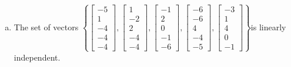 \begin{exerciseAnswer}
\begin{enumerate}[(a)]
\item  The set of vectors \( \left\{ \left[\begin{array}{c}
-5 \\
1 \\
-4 \\
-4 \\
-4
\end{array}\right] , \left[\begin{array}{c}
1 \\
-2 \\
2 \\
-4 \\
-4
\end{array}\right] , \left[\begin{array}{c}
-1 \\
2 \\
0 \\
-1 \\
-6
\end{array}\right] , \left[\begin{array}{c}
-6 \\
-6 \\
4 \\
-4 \\
-5
\end{array}\right] , \left[\begin{array}{c}
-3 \\
1 \\
4 \\
0 \\
-1
\end{array}\right] \right\} \)is linearly independent.
\end{enumerate}
    
\end{exerciseAnswer}
    
